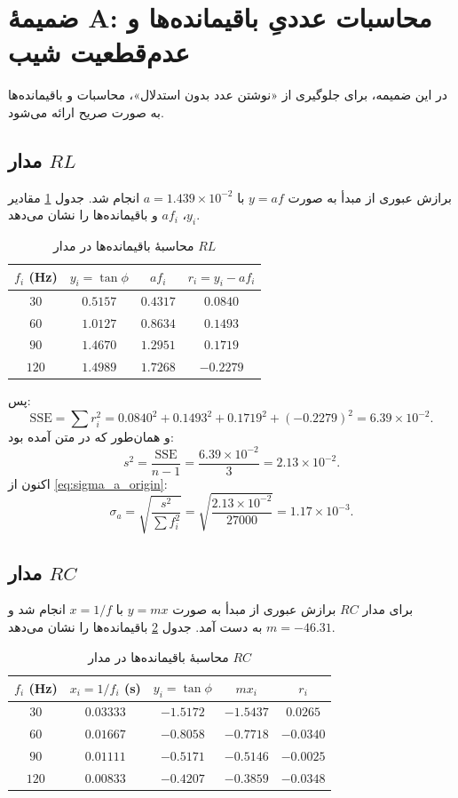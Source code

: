 \documentclass[a4paper, 11pt]{article}
\begin{document}
\appendix
\section{ضمیمهٔ A: محاسبات عددیِ باقیمانده‌ها و عدم‌قطعیت شیب}

در این ضمیمه، برای جلوگیری از «نوشتن عدد بدون استدلال»، محاسبات  و باقیمانده‌ها به صورت صریح ارائه می‌شود.

\subsection{مدار $RL$}

برازش عبوری از مبدأ به صورت \(y=af\) با \(a=1.439\times 10^{-2}\) انجام شد. جدول \ref{tab:RL_resid} مقادیر \(y_i\)، \(af_i\) و باقیمانده‌ها را نشان می‌دهد.

\begin{table}[h!]
\caption{محاسبهٔ باقیمانده‌ها در مدار $RL$}
\label{tab:RL_resid}
\centering
\begin{tabular}{cccc}
\toprule
$f_i$ (Hz) & $y_i=\tan\phi$ & $af_i$ & $r_i=y_i-af_i$\\
\midrule
$30$  & $0.5157$ & $0.4317$ & $0.0840$\\
$60$  & $1.0127$ & $0.8634$ & $0.1493$\\
$90$  & $1.4670$ & $1.2951$ & $0.1719$\\
$120$ & $1.4989$ & $1.7268$ & $-0.2279$\\
\bottomrule
\end{tabular}
\end{table}

پس:
\[
\mathrm{SSE}=\sum r_i^2
=0.0840^2+0.1493^2+0.1719^2+(-0.2279)^2
=6.39\times 10^{-2}.
\]
و همان‌طور که در متن آمده بود:
\[
s^2=\frac{\mathrm{SSE}}{n-1}=\frac{6.39\times 10^{-2}}{3}=2.13\times 10^{-2}.
\]
اکنون از \eqref{eq:sigma_a_origin}:
\[
\sigma_a=\sqrt{\frac{s^2}{\sum f_i^2}}
=\sqrt{\frac{2.13\times 10^{-2}}{27000}}
=1.17\times 10^{-3}.
\]

\subsection{مدار $RC$}

برای مدار $RC$ برازش عبوری از مبدأ به صورت \(y=mx\) با \(x=1/f\) انجام شد و \(m=-46.31\) به دست آمد. جدول \ref{tab:RC_resid} باقیمانده‌ها را نشان می‌دهد.

\begin{table}[h!]
\caption{محاسبهٔ باقیمانده‌ها در مدار $RC$}
\label{tab:RC_resid}
\centering
\begin{tabular}{ccccc}
\toprule
$f_i$ (Hz) & $x_i=1/f_i$ (s) & $y_i=\tan\phi$ & $mx_i$ & $r_i$\\
\midrule
$30$  & $0.03333$ & $-1.5172$ & $-1.5437$ & $0.0265$\\
$60$  & $0.01667$ & $-0.8058$ & $-0.7718$ & $-0.0340$\\
$90$  & $0.01111$ & $-0.5171$ & $-0.5146$ & $-0.0025$\\
$120$ & $0.00833$ & $-0.4207$ & $-0.3859$ & $-0.0348$\\
\bottomrule
\end{tabular}
\end{table}
\end{document}
